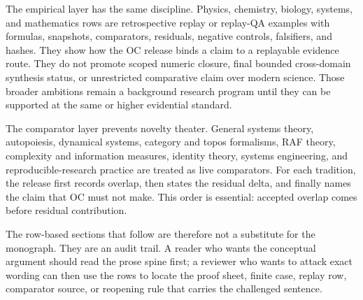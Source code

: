 The empirical layer has the same discipline. Physics, chemistry, biology, systems, and mathematics rows are retrospective replay or replay-QA examples with formulas, snapshots, comparators, residuals, negative controls, falsifiers, and hashes. They show how the OC release binds a claim to a replayable evidence route. They do not promote scoped numeric closure, final bounded cross-domain synthesis status, or unrestricted comparative claim over modern science. Those broader ambitions remain a background research program until they can be supported at the same or higher evidential standard.

The comparator layer prevents novelty theater. General systems theory, autopoiesis, dynamical systems, category and topos formalisms, RAF theory, complexity and information measures, identity theory, systems engineering, and reproducible-research practice are treated as live comparators. For each tradition, the release first records overlap, then states the residual delta, and finally names the claim that OC must not make. This order is essential: accepted overlap comes before residual contribution.

The row-based sections that follow are therefore not a substitute for the monograph. They are an audit trail. A reader who wants the conceptual argument should read the prose spine first; a reviewer who wants to attack exact wording can then use the rows to locate the proof sheet, finite case, replay row, comparator source, or reopening rule that carries the challenged sentence.
